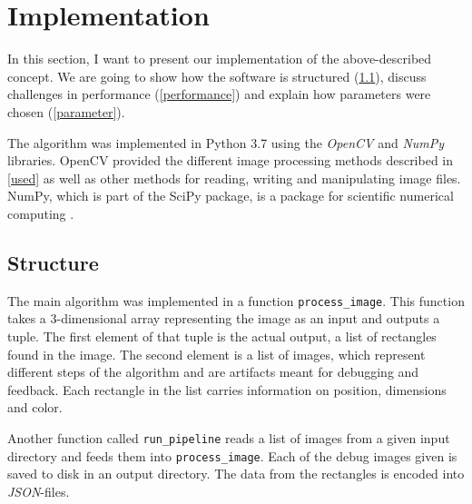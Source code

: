 \section{Implementation} \label{implementation}

In this section, I want to present our implementation of the above-described
concept. We are going to show how the software is structured
(\ref{structure}), discuss challenges in performance (\ref{performance}) and
explain how parameters were chosen (\ref{parameter}).

The algorithm was implemented in Python 3.7 using the \textit{OpenCV} and
\textit{NumPy} libraries. OpenCV provided the different image processing methods
described in \ref{used} as well as other methods for reading, writing and
manipulating image files. NumPy, which is part of the SciPy package, is a
package for scientific numerical computing \cite{scipy}.


\subsection{Structure} \label{structure}

The main algorithm was implemented in a function \texttt{process\_image}. This
function takes a 3-dimensional array representing the image as an input and
outputs a tuple. The first element of that tuple is the actual output, a list of
rectangles found in the image. The second element is a list of images, which
represent different steps of the algorithm and are artifacts meant for debugging
and feedback. Each rectangle in the list carries information on position, dimensions
and color.


Another function called \texttt{run\_pipeline} reads a list of images from a
given input directory and feeds them into \texttt{process\_image}. Each of the
debug images given is saved to disk in an output directory. The data from the
rectangles is encoded into \textit{JSON}-files.


